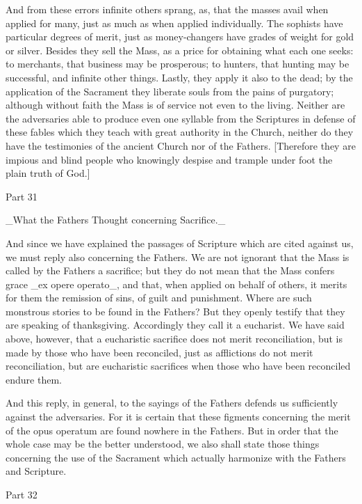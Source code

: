 And from these errors infinite others sprang, as, that the masses
avail when applied for many, just as much as when applied
individually.  The sophists have particular degrees of merit, just as
money-changers have grades of weight for gold or silver.  Besides
they sell the Mass, as a price for obtaining what each one seeks: to
merchants, that business may be prosperous; to hunters, that hunting
may be successful, and infinite other things.  Lastly, they apply it
also to the dead; by the application of the Sacrament they liberate
souls from the pains of purgatory; although without faith the Mass is
of service not even to the living.  Neither are the adversaries able
to produce even one syllable from the Scriptures in defense of these
fables which they teach with great authority in the Church, neither
do they have the testimonies of the ancient Church nor of the Fathers.
[Therefore they are impious and blind people who knowingly despise
and trample under foot the plain truth of God.]




Part 31


_What the Fathers Thought concerning Sacrifice._

And since we have explained the passages of Scripture which are cited
against us, we must reply also concerning the Fathers.  We are not
ignorant that the Mass is called by the Fathers a sacrifice; but they
do not mean that the Mass confers grace _ex opere operato_, and that,
when applied on behalf of others, it merits for them the remission of
sins, of guilt and punishment.  Where are such monstrous stories to
be found in the Fathers?  But they openly testify that they are
speaking of thanksgiving.  Accordingly they call it a eucharist.  We
have said above, however, that a eucharistic sacrifice does not merit
reconciliation, but is made by those who have been reconciled, just
as afflictions do not merit reconciliation, but are eucharistic
sacrifices when those who have been reconciled endure them.

And this reply, in general, to the sayings of the Fathers defends us
sufficiently against the adversaries.  For it is certain that these
figments concerning the merit of the opus operatum are found nowhere
in the Fathers.  But in order that the whole case may be the better
understood, we also shall state those things concerning the use of
the Sacrament which actually harmonize with the Fathers and Scripture.




Part 32


